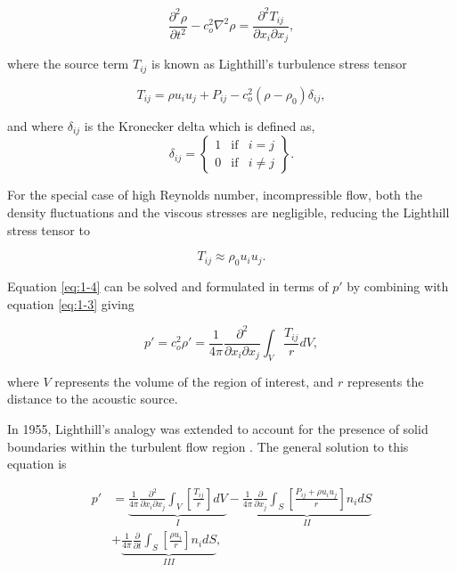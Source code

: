 \begin{equation} \label{eq:1-4}
\frac{\partial^2 \rho}{\partial t^2} - c_o^2 \nabla^2 \rho = \frac{\partial^2 T_{ij}}{\partial x_i \partial x_j},
\end{equation}

where the source term $T_{ij}$ is known as Lighthill's turbulence stress tensor

\begin{equation}
T_{ij} = \rho u_i u_j + P_{ij} - c_o^2(\rho - \rho_0) \delta_{ij},
\end{equation}

and where $\delta_{ij}$ is the Kronecker delta which is defined as,
\begin{equation}
\delta_{ij} = \left\{
\begin{array}{lcr}
1 & \mbox{if} & i = j \\
0 & \mbox{if} & i \neq j
\end{array}
\right\}.
\end{equation}

For the special case of high Reynolds number, incompressible flow, both the density fluctuations and the viscous stresses are negligible, reducing the Lighthill stress tensor to

\begin{equation}
T_{ij} \approx \rho_0 u_i u_j.
\end{equation}

Equation \ref{eq:1-4} can be solved and formulated in terms of $p'$ by combining with equation \ref{eq:1-3} giving

\begin{equation} \label{eq:pflux}
p' = c_o^2 \rho' = \frac{1}{4\pi} \frac{\partial^2}{\partial x_i \partial x_j} \int_{V} \frac{T_{ij}}{r}dV,
\end{equation}

where $V$ represents the volume of the region of interest, and $r$ represents the distance to the acoustic source.

In 1955, Lighthill's analogy was extended to account for the presence of solid boundaries within the turbulent flow region \cite{curle1955}.  The general solution to this equation is 

\begin{equation} \label{eq:1-9}
\begin{aligned}
p' &= \underbrace{ \frac{1}{4\pi} \frac{\partial^2}{\partial x_i \partial x_j} \int_V \left[ \frac{T_{ij}}{r} \right] dV }_I - \underbrace{ \frac{1}{4\pi} \frac{\partial}{\partial x_j} \int_S \left[ \frac{P_{ij} + \rho u_i u_j}{r} \right] n_i dS }_{II} \\
&+ \underbrace{ \frac{1}{4\pi} \frac{\partial}{\partial t} \int_S \left[ \frac{\rho u_i}{r} \right] n_i dS}_{III},
\end{aligned}
\end{equation}

